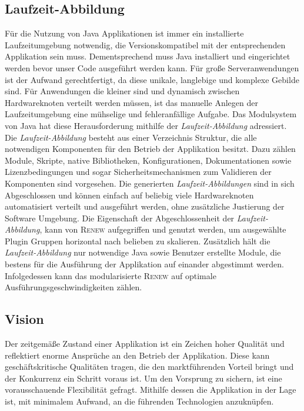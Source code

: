 	\subsection{Laufzeit-Abbildung} \label{sub:laufzeit_images}
		Für die Nutzung von Java Applikationen ist immer ein installierte Laufzeitumgebung notwendig, die Versionskompatibel mit der entsprechenden Applikation sein muss. Dementsprechend muss Java installiert und eingerichtet werden bevor unser Code ausgeführt werden kann. Für große Serveranwendungen ist der Aufwand gerechtfertigt, da diese unikale, langlebige und komplexe Gebilde sind. Für Anwendungen die kleiner sind und dynamisch zwischen Hardwareknoten verteilt werden müssen, ist das manuelle Anlegen der Laufzeitumgebung eine mühselige und fehleranfällige Aufgabe. \newline
		Das Modulsystem von Java hat diese Herausforderung mithilfe der \textit{Laufzeit-Abbildung} adressiert. Die \textit{Laufzeit-Abbildung} besteht aus einer Verzeichnis Struktur, die alle notwendigen Komponenten für den Betrieb der Applikation besitzt. Dazu zählen Module, Skripte, native Bibliotheken, Konfigurationen, Dokumentationen sowie Lizenzbedingungen und sogar Sicherheitsmechanismen zum Validieren der Komponenten sind vorgesehen. Die generierten \textit{Laufzeit-Abbildungen} sind in sich Abgeschlossen und können einfach auf beliebig viele Hardwareknoten automatisiert verteilt und ausgeführt werden, ohne zusätzliche Justierung der Software Umgebung. \bigbreak
		Die Eigenschaft der Abgeschlossenheit der \textit{Laufzeit-Abbildung}, kann von \textsc{Renew} aufgegriffen und genutzt werden, um ausgewählte Plugin Gruppen horizontal nach belieben zu skalieren. Zusätzlich hält die \textit{Laufzeit-Abbildung} nur notwendige Java sowie Benutzer erstellte Module, die bestens für die Ausführung der Applikation auf einander abgestimmt werden. Infolgedessen kann das modularisierte \textsc{Renew} auf optimale Ausführungsgeschwindigkeiten zählen. 

	\subsection{Vision} \label{sub:moderner_zustand}
		Der zeitgemäße Zustand einer Applikation ist ein Zeichen hoher Qualität und reflektiert enorme Ansprüche an den Betrieb der Applikation. Diese kann geschäftskritische Qualitäten tragen, die den marktführenden Vorteil bringt und der Konkurrenz ein Schritt voraus ist. Um den Vorsprung zu sichern, ist eine vorausschauende Flexibilität gefragt. Mithilfe dessen die Applikation in der Lage ist, mit minimalem Aufwand, an die führenden Technologien anzuknüpfen.

